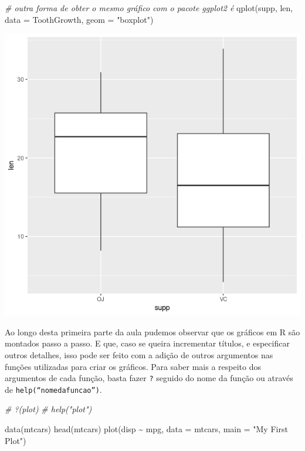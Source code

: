 \documentclass[
]{book}
\newenvironment{Shaded}{\begin{snugshade}}{\end{snugshade}}
\newcommand{\AttributeTok}[1]{\textcolor[rgb]{0.77,0.63,0.00}{#1}}
\newcommand{\CommentTok}[1]{\textcolor[rgb]{0.56,0.35,0.01}{\textit{#1}}}
\newcommand{\FunctionTok}[1]{\textcolor[rgb]{0.00,0.00,0.00}{#1}}
\newcommand{\NormalTok}[1]{#1}
\newcommand{\SpecialCharTok}[1]{\textcolor[rgb]{0.00,0.00,0.00}{#1}}
\newcommand{\StringTok}[1]{\textcolor[rgb]{0.31,0.60,0.02}{#1}}
\begin{document}
\begin{Shaded}
\begin{Highlighting}[]
\CommentTok{\# outra forma de obter o mesmo gráfico com o pacote ggplot2 é}
\FunctionTok{qplot}\NormalTok{(supp, len, }\AttributeTok{data =}\NormalTok{ ToothGrowth, }\AttributeTok{geom =} \StringTok{"boxplot"}\NormalTok{)}
\end{Highlighting}
\end{Shaded}

\includegraphics{figure/g10.png}

Ao longo desta primeira parte da aula pudemos observar que os gráficos em R são montados passo a passo. E que, caso se queira incrementar títulos, e especificar outros detalhes, isso pode ser feito com a adição de outros argumentos nas funções utilizadas para criar os gráficos. Para saber mais a respeito dos argumentos de cada função, basta fazer \texttt{?} seguido do nome da função ou através de \texttt{help(“nomedafuncao”)}.

\begin{Shaded}
\begin{Highlighting}[]
\CommentTok{\# \textasciigrave{}?\textasciigrave{}(plot)}
\CommentTok{\# help("plot")}

\FunctionTok{data}\NormalTok{(mtcars)}
\FunctionTok{head}\NormalTok{(mtcars)}
\FunctionTok{plot}\NormalTok{(disp }\SpecialCharTok{\textasciitilde{}}\NormalTok{ mpg, }\AttributeTok{data =}\NormalTok{ mtcars, }\AttributeTok{main =} \StringTok{"My First Plot"}\NormalTok{)}
\end{Highlighting}
\end{Shaded}
\end{document}
